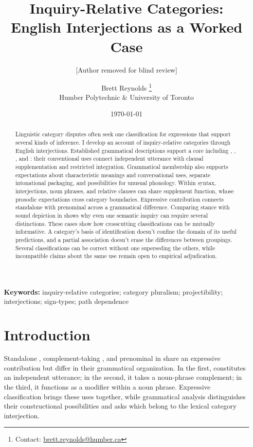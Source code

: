 \documentclass[12pt]{article}
\title{Inquiry-Relative Categories:\\English Interjections as a Worked Case}
\author{[Author removed for blind review]}
\author{Brett Reynolds \orcidlink{0000-0003-0073-7195}%
\thanks{Contact: \href{mailto:brett.reynolds@humber.ca}{brett.reynolds@humber.ca}}\\
Humber Polytechnic \& University of Toronto}
\date{\today}
\begin{document}
\maketitle

\begin{abstract}
Linguistic category disputes often seek one classification for expressions
that support several kinds of inference. I develop an account of
inquiry-relative categories through English interjections. Established
grammatical descriptions support a core including ,
, , and : their conventional uses
connect independent utterance with clausal supplementation and restricted
integration. Grammatical membership also supports expectations about
characteristic meanings and conversational uses, separate intonational
packaging, and possibilities for unusual phonology. Within syntax,
interjections, noun phrases, and relative clauses can share supplement
function, whose prosodic expectations cross category boundaries. Expressive contribution connects standalone
 with prenominal  across a grammatical
difference. Comparing stance with sound depiction in 
shows why even one semantic inquiry can require several distinctions.
These cases show how crosscutting classifications can be mutually
informative. A category's basis of identification doesn't confine the
domain of its useful predictions, and a partial association doesn't
erase the differences between groupings. Several classifications can
be correct without one superseding the others, while incompatible
claims about the same use remain open to empirical adjudication.
\end{abstract}

\noindent\textbf{Keywords:} inquiry-relative categories; category pluralism;
projectibility; interjections; sign-types; path dependence


\section{Introduction}\label{sec:intro}

Standalone , complement-taking ,
and prenominal  in  share an expressive
contribution but differ in their grammatical organization. In the first,
 constitutes an independent utterance; in the second, it
takes a noun-phrase complement; in the third, it functions as a modifier
within a noun phrase. Expressive classification brings these uses together,
while grammatical analysis distinguishes their constructional possibilities
and asks which belong to the lexical category interjection.
\end{document}
